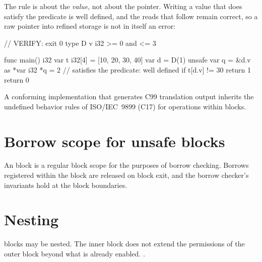 \pnum
The rule is about the \emph{value}, not about the pointer.  Writing a value that does satisfy the
predicate is well defined, and the reads that follow remain correct, so a raw pointer into refined
storage is not in itself an error:

\begin{laincode}
// VERIFY: exit 0
type D { v i32 >= 0 and <= 3 }

func main() i32 {
    var t i32[4] = [10, 20, 30, 40]
    var d = D(1)
    unsafe {
        var q = &d.v as *var i32
        *q = 2                   // satisfies the predicate: well defined
    }
    if t[d.v] != 30 { return 1 }
    return 0
}
\end{laincode}

\pnum
A conforming implementation that generates C99 translation output inherits
the undefined behavior rules of ISO/IEC~9899 (C17) for operations within
 blocks.

\section{Borrow scope for unsafe blocks}
\label{sec:unsafe.borrow-scope}

\pnum
An  block is a regular block scope for the purposes of borrow
checking.  Borrows registered within the block are released on block exit,
and the borrow checker's invariants hold at the block boundaries.

\section{Nesting}
\label{sec:unsafe.nesting}

\pnum
{} blocks may be nested.  The inner block does not extend the
permissions of the outer block beyond what is already enabled.
.
